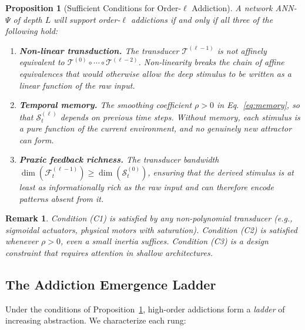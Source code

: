 \documentclass[12pt,a4paper]{article}
\newtheorem{proposition}{Proposition}
\newtheorem{remark}{Remark}
\newcommand{\tens}[1]{\boldsymbol{\mathcal{#1}}}
\begin{document}
\begin{proposition}[Sufficient Conditions for Order-$\ell$ Addiction]
\label{prop:conditions}
A network ANN-$\Psi$ of depth $L$ will support order-$\ell$ addictions if and
only if all three of the following hold:
\begin{enumerate}
\item[(C1)] \textbf{Non-linear transduction.} The transducer $\mathcal{T}^{(\ell-1)}$
is not affinely equivalent to $\mathcal{T}^{(0)} \circ \cdots \circ
\mathcal{T}^{(\ell-2)}$. Non-linearity breaks the chain of affine equivalences
that would otherwise allow the deep stimulus to be written as a linear
function of the raw input.

\item[(C2)] \textbf{Temporal memory.} The smoothing coefficient $\rho > 0$ in
Eq.~\eqref{eq:memory}, so that $\tens{S}_t^{(\ell)}$ depends on previous time
steps. Without memory, each stimulus is a pure function of the current
environment, and no genuinely new attractor can form.

\item[(C3)] \textbf{Praxic feedback richness.} The transducer bandwidth
$\dim(\tens{F}_t^{(\ell-1)}) \geq \dim(\tens{S}_t^{(0)})$, ensuring that the
derived stimulus is at least as informationally rich as the raw input and can
therefore encode patterns absent from it.
\end{enumerate}
\end{proposition}

\begin{remark}
Condition (C1) is satisfied by any non-polynomial transducer (e.g., sigmoidal
actuators, physical motors with saturation). Condition (C2) is satisfied whenever
$\rho > 0$, even a small inertia suffices. Condition (C3) is a design constraint
that requires attention in shallow architectures.
\end{remark}

\subsection{The Addiction Emergence Ladder}

Under the conditions of Proposition~\ref{prop:conditions}, high-order addictions
form a \textit{ladder} of increasing abstraction. We characterize each rung:
\end{document}
